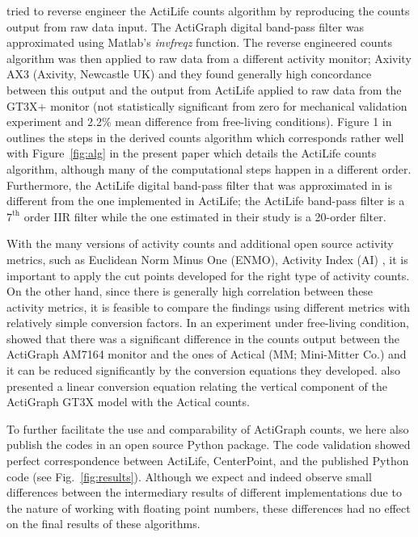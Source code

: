 \documentclass{bmcart}
\begin{document}
\citet{brond_generating_2017} tried to reverse engineer the ActiLife counts
algorithm by reproducing the counts output from raw data input. The ActiGraph
digital band-pass filter was approximated using Matlab’s \emph{invfreqz}
function. The reverse engineered counts algorithm was then applied to raw data
from a different activity monitor; Axivity AX3 (Axivity, Newcastle UK) and they
found generally high concordance between this output and the output from
ActiLife applied to raw data from the GT3X+ monitor (not statistically
significant from zero for mechanical validation experiment and 2.2\% mean
difference from free-living conditions). Figure 1 in
\citet{brond_generating_2017} outlines the steps in the derived counts
algorithm which corresponds rather well with Figure~\ref{fig:alg} in the
present paper which details the ActiLife counts algorithm, although many of the
computational steps happen in a different order. Furthermore, the ActiLife
digital band-pass filter that was approximated in \citet{brond_generating_2017}
is different from the one implemented in ActiLife; the ActiLife band-pass
filter is a $7^\textrm{th}$ order IIR filter while the one estimated in their
study is a 20-order filter.

With the many versions of activity counts and additional open source activity
metrics, such as Euclidean Norm Minus One (ENMO), Activity Index (AI)
\cite{bai_activity_2016, hees_separating_2013}, it is important to apply the
cut points developed for the right type of activity counts.  On the other hand,
since there is generally high correlation between these activity metrics, it is
feasible to compare the findings using different metrics with relatively simple
conversion factors.  In an experiment under free-living condition,
\citet{paul_comparison_2007} showed that there was a significant difference in
the counts output between the ActiGraph AM7164 monitor and the ones of Actical
(MM; Mini-Mitter Co.) and it can be reduced significantly by the conversion
equations they developed. \citet{straker_translation_2012} also presented a
linear conversion equation relating the vertical component of the ActiGraph
GT3X model with the Actical counts.

To further facilitate the use and comparability of ActiGraph counts, we here
also publish the codes in an open source Python package. The code validation
showed perfect correspondence between ActiLife, CenterPoint, and the published
Python code (see Fig.~\ref{fig:results}). Although we expect and indeed observe
small differences between the intermediary results of different implementations
due to the nature of working with floating point numbers, these differences had no
effect on the final results of these algorithms.
\end{document}
